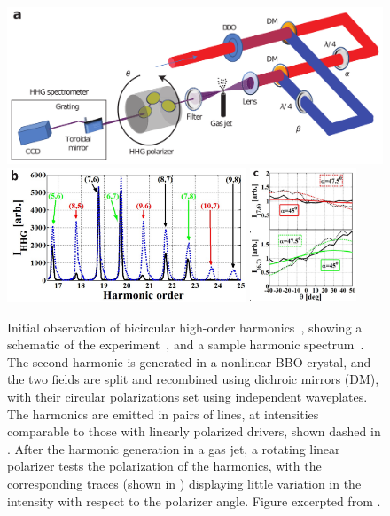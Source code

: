 $\quad$


\begin{figure}[b!h]
  \centering
  \subfloat{\label{f8-fleischer-bicircular-spectrum-a}}
  \includegraphics[scale=0.85]{8-Spin-HHG/Figures/figure8Ba.png}
  \\[4mm]
  \subfloat{\label{f8-fleischer-bicircular-spectrum-b}}
  \includegraphics[height=4cm]{8-Spin-HHG/Figures/figure8Bb.png}
  \hspace{5mm}
  \subfloat{\label{f8-fleischer-bicircular-spectrum-c}}
  \includegraphics[height=4cm]{8-Spin-HHG/Figures/figure8Bc.png}
  \caption[
  Initial observation of bicircular high-order harmonics by A. Fleischer~et~al.
  ]{
  Initial observation of bicircular high-order harmonics~\cite{fleischer_spin_2014}, showing a schematic of the experiment~\protect{}, and a sample harmonic spectrum~\protect{}. The second harmonic is generated in a nonlinear BBO crystal, and the two fields are split and recombined using dichroic mirrors (DM), with their circular polarizations set using independent waveplates. 
  The harmonics are emitted in pairs of lines, at intensities comparable to those with linearly polarized drivers, shown dashed in \protect{}.
  After the harmonic generation in a gas jet, a rotating linear polarizer tests the polarization of the harmonics, with the corresponding traces (shown in \protect{}) displaying little variation in the intensity with respect to the polarizer angle.
  Figure excerpted from .
  }
  \label{f8-fleischer-bicircular-spectrum}
\end{figure}

